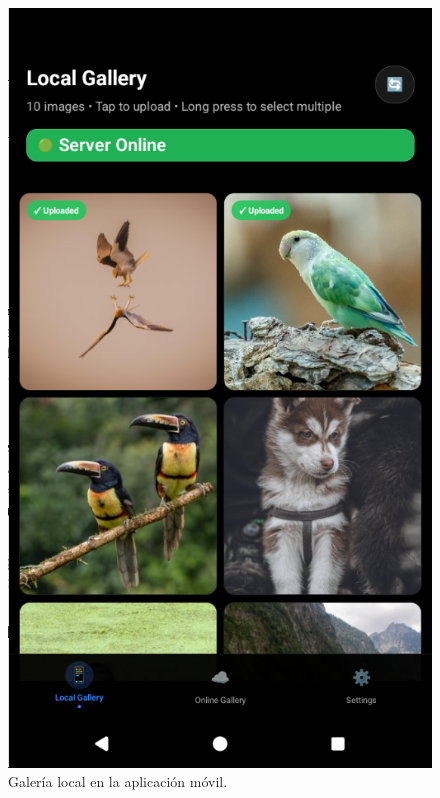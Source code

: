 \begin{figure}[H]
  \begin{minipage}[t]{0.3\textwidth}
    \centering
    \includegraphics[width=\textwidth]{assets/local-gallery-mobile.png}
    \caption{Galería local en la aplicación móvil.}
    \label{fig:local-gallery-mobile}
  \end{minipage}
  \hfill
  \begin{minipage}[t]{0.3\textwidth}
    \centering

\end{minipage}
\end{figure}
